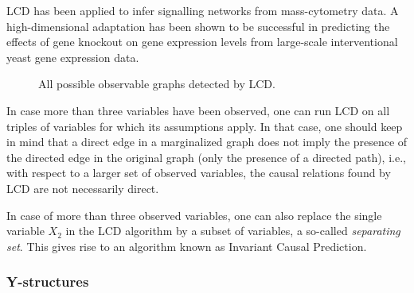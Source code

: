 LCD has been applied to infer signalling networks from mass-cytometry data. A high-dimensional
adaptation has been shown to be successful in predicting the effects of gene knockout on gene
expression levels from large-scale interventional yeast gene expression data.

\begin{figure}
  \centering
  \caption{All possible observable graphs detected by LCD.\label{fig:LCD}}
\end{figure}

In case more than three variables have been observed, one can run LCD on all triples of variables for which its assumptions apply.
In that case, one should keep in mind that a direct edge in a marginalized graph does not imply the presence of the directed 
edge in the original graph (only the presence of a directed path), i.e., with respect to a larger set of observed variables, 
the causal relations found by LCD are not necessarily direct.

In case of more than three observed variables, one can also replace the single variable $X_2$ in the LCD algorithm by a subset
of variables, a so-called \emph{separating set}. This gives rise to an algorithm known as Invariant Causal Prediction.

\subsubsection{Y-structures}

